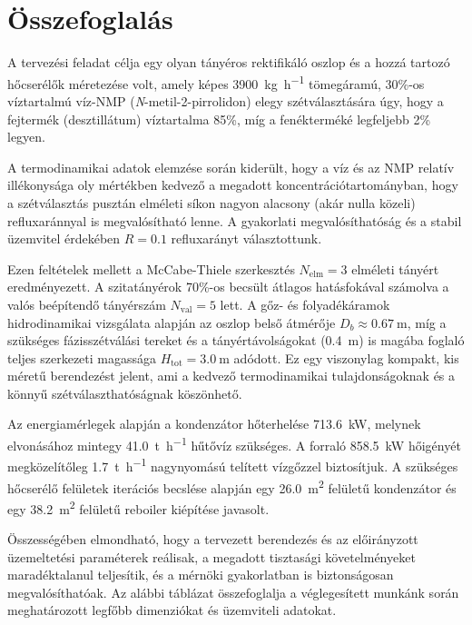 
\section{Összefoglalás}\label{sec:C1osszefogl}

A tervezési feladat célja egy olyan tányéros rektifikáló oszlop és a hozzá tartozó hőcserélők méretezése volt, amely képes \qty{3900}{\kg\per\hour} tömegáramú, \num{30}\%-os víztartalmú víz-NMP (\textit{N}-metil-2-pirrolidon) elegy szétválasztására úgy, hogy a fejtermék (desztillátum) víztartalma \num{85}\%, míg a fenékterméké legfeljebb \num{2}\% legyen.

A termodinamikai adatok elemzése során kiderült, hogy a víz és az NMP relatív illékonysága oly mértékben kedvező a megadott koncentrációtartományban, hogy a szétválasztás pusztán elméleti síkon nagyon alacsony (akár nulla közeli) refluxaránnyal is megvalósítható lenne. A gyakorlati megvalósíthatóság és a stabil üzemvitel érdekében $R = \num{0.1}$ refluxarányt választottunk.

Ezen feltételek mellett a McCabe-Thiele szerkesztés $N_{\text{elm}} = \num{3}$ elméleti tányért eredményezett. A szitatányérok \num{70}\%-os becsült átlagos hatásfokával számolva a valós beépítendő tányérszám $N_{\text{val}} = \num{5}$ lett. A gőz- és folyadékáramok hidrodinamikai vizsgálata alapján az oszlop belső átmérője $D_b \approx \qty{0.67}{\metre}$, míg a szükséges fázisszétválási tereket és a tányértávolságokat (\qty{0.4}{\metre}) is magába foglaló teljes szerkezeti magassága $H_{\text{tot}} = \qty{3.0}{\metre}$ adódott. Ez egy viszonylag kompakt, kis méretű berendezést jelent, ami a kedvező termodinamikai tulajdonságoknak és a könnyű szétválaszthatóságnak köszönhető.

Az energiamérlegek alapján a kondenzátor hőterhelése \qty{713.6}{\kilo\watt}, melynek elvonásához mintegy \qty{41.0}{\tonne\per\hour} hűtővíz szükséges. A forraló \qty{858.5}{\kilo\watt} hőigényét megközelítőleg \qty{1.7}{\tonne\per\hour} nagynyomású telített vízgőzzel biztosítjuk. A szükséges hőcserélő felületek iterációs becslése alapján egy \qty{26.0}{\metre\squared} felületű kondenzátor és egy \qty{38.2}{\metre\squared} felületű reboiler kiépítése javasolt.

Összességében elmondható, hogy a tervezett berendezés és az előirányzott üzemeltetési paraméterek reálisak, a megadott tisztasági követelményeket maradéktalanul teljesítik, és a mérnöki gyakorlatban is biztonságosan megvalósíthatóak. Az alábbi táblázat összefoglalja a véglegesített munkánk során meghatározott legfőbb dimenziókat és üzemviteli adatokat.

